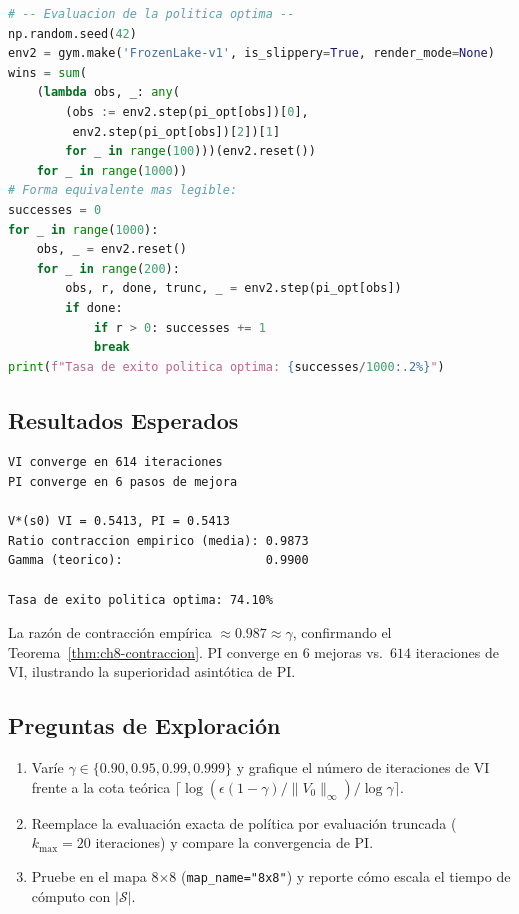 \begin{lstlisting}[language=Python, caption={Lab F.8: VI y PI en FrozenLake con verificación de contraccion.}]
# -- Evaluacion de la politica optima --
np.random.seed(42)
env2 = gym.make('FrozenLake-v1', is_slippery=True, render_mode=None)
wins = sum(
    (lambda obs, _: any(
        (obs := env2.step(pi_opt[obs])[0],
         env2.step(pi_opt[obs])[2])[1]
        for _ in range(100)))(env2.reset())
    for _ in range(1000))
# Forma equivalente mas legible:
successes = 0
for _ in range(1000):
    obs, _ = env2.reset()
    for _ in range(200):
        obs, r, done, trunc, _ = env2.step(pi_opt[obs])
        if done:
            if r > 0: successes += 1
            break
print(f"Tasa de exito politica optima: {successes/1000:.2%}")
\end{lstlisting}

\subsection*{Resultados Esperados}

\begin{verbatim}
VI converge en 614 iteraciones
PI converge en 6 pasos de mejora

V*(s0) VI = 0.5413, PI = 0.5413
Ratio contraccion empirico (media): 0.9873
Gamma (teorico):                    0.9900

Tasa de exito politica optima: 74.10%
\end{verbatim}

La razón de contracción empírica $\approx 0.987 \approx \gamma$, confirmando
el Teorema~\ref{thm:ch8-contraccion}. PI converge en $6$ mejoras vs.\ $614$
iteraciones de VI, ilustrando la superioridad asintótica de PI.

\subsection*{Preguntas de Exploración}

\begin{enumerate}
    \item Varíe $\gamma \in \{0.90, 0.95, 0.99, 0.999\}$ y grafique el número
          de iteraciones de VI frente a la cota teórica
          $\lceil\log(\epsilon(1-\gamma)/\|V_0\|_\infty)/\log\gamma\rceil$.
    \item Reemplace la evaluación exacta de política por evaluación truncada
          ($k_{\max}=20$ iteraciones) y compare la convergencia de PI.
    \item Pruebe en el mapa 8$\times$8 (\texttt{map\_name="8x8"}) y reporte
          cómo escala el tiempo de cómputo con $|\mathcal{S}|$.
\end{enumerate}

